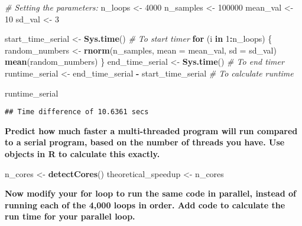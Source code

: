 \documentclass[
]{article}
\newenvironment{Shaded}{\begin{snugshade}}{\end{snugshade}}
\newcommand{\AttributeTok}[1]{\textcolor[rgb]{0.13,0.29,0.53}{#1}}
\newcommand{\CommentTok}[1]{\textcolor[rgb]{0.56,0.35,0.01}{\textit{#1}}}
\newcommand{\ControlFlowTok}[1]{\textcolor[rgb]{0.13,0.29,0.53}{\textbf{#1}}}
\newcommand{\DecValTok}[1]{\textcolor[rgb]{0.00,0.00,0.81}{#1}}
\newcommand{\FunctionTok}[1]{\textcolor[rgb]{0.13,0.29,0.53}{\textbf{#1}}}
\newcommand{\NormalTok}[1]{#1}
\newcommand{\OtherTok}[1]{\textcolor[rgb]{0.56,0.35,0.01}{#1}}
\newcommand{\SpecialCharTok}[1]{\textcolor[rgb]{0.81,0.36,0.00}{\textbf{#1}}}
\begin{document}
\begin{Shaded}
\begin{Highlighting}[]
\CommentTok{\# Setting the parameters:}
\NormalTok{n\_loops }\OtherTok{\textless{}{-}} \DecValTok{4000}
\NormalTok{n\_samples }\OtherTok{\textless{}{-}} \DecValTok{100000}
\NormalTok{mean\_val }\OtherTok{\textless{}{-}} \DecValTok{10}
\NormalTok{sd\_val }\OtherTok{\textless{}{-}} \DecValTok{3}

\NormalTok{start\_time\_serial }\OtherTok{\textless{}{-}} \FunctionTok{Sys.time}\NormalTok{()  }\CommentTok{\# To start timer}
\ControlFlowTok{for}\NormalTok{ (i }\ControlFlowTok{in} \DecValTok{1}\SpecialCharTok{:}\NormalTok{n\_loops) \{}
\NormalTok{  random\_numbers }\OtherTok{\textless{}{-}} \FunctionTok{rnorm}\NormalTok{(n\_samples, }\AttributeTok{mean =}\NormalTok{ mean\_val, }\AttributeTok{sd =}\NormalTok{ sd\_val)}
  \FunctionTok{mean}\NormalTok{(random\_numbers)}
\NormalTok{\}}
\NormalTok{end\_time\_serial }\OtherTok{\textless{}{-}} \FunctionTok{Sys.time}\NormalTok{()  }\CommentTok{\# To end timer}
\NormalTok{runtime\_serial }\OtherTok{\textless{}{-}}\NormalTok{ end\_time\_serial }\SpecialCharTok{{-}}\NormalTok{ start\_time\_serial  }\CommentTok{\# To calculate runtime}

\NormalTok{runtime\_serial}
\end{Highlighting}
\end{Shaded}

\begin{verbatim}
## Time difference of 10.6361 secs
\end{verbatim}

\textbf{Predict how much faster a multi-threaded program will run
compared to a serial program, based on the number of threads you have.
Use objects in R to calculate this exactly.}

\begin{Shaded}
\begin{Highlighting}[]
\NormalTok{n\_cores }\OtherTok{\textless{}{-}} \FunctionTok{detectCores}\NormalTok{()}
\NormalTok{theoretical\_speedup }\OtherTok{\textless{}{-}}\NormalTok{ n\_cores}
\end{Highlighting}
\end{Shaded}

\textbf{Now modify your for loop to run the same code in parallel,
instead of running each of the 4,000 loops in order. Add code to
calculate the run time for your parallel loop.}
\end{document}
